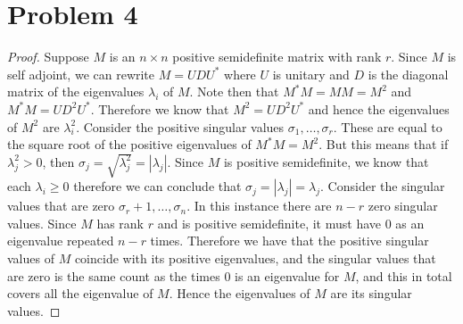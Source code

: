 \documentclass{article}
\begin{document}
\section*{Problem 4}
\begin{proof}
    Suppose $M$ is an $n\times n$ positive semidefinite matrix with rank $r$. Since $M$ is self adjoint, we can rewrite $M = UDU^*$ where $U$ is unitary and $D$ is the diagonal matrix of the eigenvalues $\lambda_i$ of $M$. Note then that $M^* M = M M = M^2$ and $M^* M = U D^2 U^*$. Therefore we know that $M^2 = U D^2 U^*$ and hence the eigenvalues of $M^2$ are $\lambda_i^2$. Consider the positive singular values $\sigma_1, \ldots, \sigma_r$. These are equal to the square root of the positive eigenvalues of $M^* M = M^2$. But this means that if $\lambda_j^2 > 0$, then $\sigma_j = \sqrt{\lambda_j^2} = |\lambda_j|$. Since $M$ is positive semidefinite, we know that each $\lambda_i \geq 0$ therefore we can conclude that $\sigma_j = |\lambda_j| = \lambda_j$. Consider the singular values that are zero $\sigma_r+1, \ldots, \sigma_n$. In this instance there are $n - r$ zero singular values. Since $M$ has rank $r$ and is positive semidefinite, it must have $0$ as an eigenvalue repeated $n-r$ times. Therefore we have that the positive singular values of $M$ coincide with its positive eigenvalues, and the singular values that are zero is the same count as the times $0$ is an eigenvalue for $M$, and this in total covers all the eigenvalue of $M$. Hence the eigenvalues of $M$ are its singular values.
\end{proof}
\end{document}
